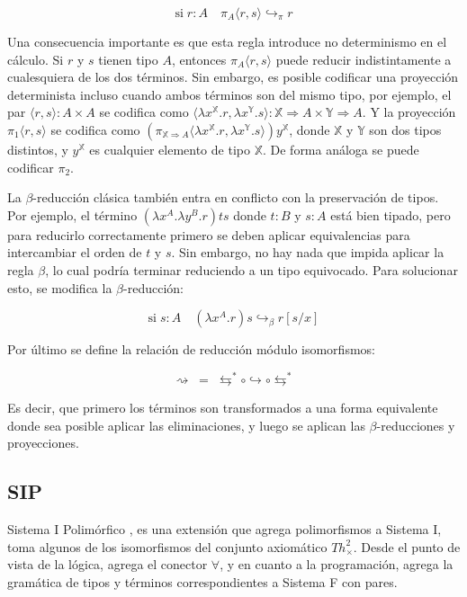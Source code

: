 \documentclass[]{report}
\begin{document}
	\[ \text{si} \; r:A \quad \pi_A \langle r, s \rangle \hookrightarrow_{\pi} r \]
	
	Una consecuencia importante es que esta regla introduce no determinismo en el cálculo.
	Si $r$ y $s$ tienen tipo $A$, entonces $\pi_A \langle r, s \rangle$ puede reducir indistintamente a cualesquiera de los dos términos.
	Sin embargo, es posible codificar una proyección determinista incluso cuando ambos términos son del mismo tipo, por ejemplo, el par $\langle r, s \rangle: A \times A$
	se codifica como $\langle \lambda x^\mathbb{X}.r, \lambda x^\mathbb{Y}.s \rangle : \mathbb{X} \Rightarrow A \times \mathbb{Y} \Rightarrow A$.
	Y la proyección $\pi_1 \langle r, s \rangle$ se codifica como $(\pi_{\mathbb{X} \Rightarrow A} \langle \lambda x^\mathbb{X}.r, \lambda x^\mathbb{Y}.s \rangle) y^\mathbb{X}$, donde $\mathbb{X}$ y $\mathbb{Y}$ son dos tipos distintos, y $y^\mathbb{X}$ es cualquier elemento de tipo $\mathbb{X}$. De forma análoga se puede codificar $\pi_2$.

	
	La $\beta$-reducción clásica también entra en conflicto con la preservación de tipos.
	Por ejemplo, el término $(\lambda x^A . \lambda y^B . r)ts$ donde $t:B$ y $s:A$ está bien tipado, pero para reducirlo correctamente primero se deben aplicar equivalencias para intercambiar el orden de $t$ y $s$.
	Sin embargo, no hay nada que impida aplicar la regla $\beta$, lo cual podría terminar reduciendo a un tipo equivocado.
	Para solucionar esto, se modifica la $\beta$-reducción:
	
	\[ \text{si} \; s:A \quad (\lambda x^A.r) s \hookrightarrow_{\beta} r[s/x] \]
	
	Por último se define la relación de reducción módulo isomorfismos:
	
	\[ \rightsquigarrow \; = \; \leftrightarrows^* \circ \hookrightarrow \circ \leftrightarrows^* \]
	
	Es decir, que primero los términos son transformados a una forma equivalente donde sea posible aplicar las eliminaciones, y luego se aplican las $\beta$-reducciones y proyecciones.
	
	
	\subsection{SIP}
	Sistema I Polimórfico \cite{sip}, es una extensión que agrega polimorfismos a Sistema I, toma algunos de los isomorfismos del conjunto axiomático $Th^2_\times$.
	Desde el punto de vista de la lógica, agrega el conector $\forall$, y en cuanto a la programación, agrega la gramática de tipos y términos correspondientes a Sistema F con pares.
	
\end{document}
